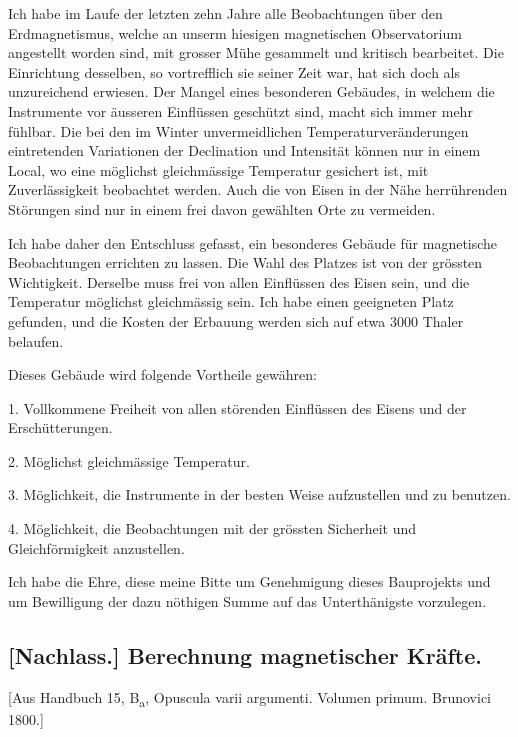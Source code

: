 \documentclass[12pt,a4paper]{article}
\begin{document}
Ich habe im Laufe der letzten zehn Jahre alle Beobachtungen \"uber den Erdmagnetismus, welche an unserm hiesigen magnetischen Observatorium angestellt worden sind, mit grosser M\"uhe gesammelt und kritisch bearbeitet. Die Einrichtung desselben, so vortrefflich sie seiner Zeit war, hat sich doch als unzureichend erwiesen. Der Mangel eines besonderen Geb\"audes, in welchem die Instrumente vor \"ausseren Einfl\"ussen gesch\"utzt sind, macht sich immer mehr f\"uhlbar. Die bei den im Winter unvermeidlichen Temperaturver\"anderungen eintretenden Variationen der Declination und Intensit\"at k\"onnen nur in einem Local, wo eine m\"oglichst gleichm\"assige Temperatur gesichert ist, mit Zuverl\"assigkeit beobachtet werden. Auch die von Eisen in der N\"ahe herr\"uhrenden St\"orungen sind nur in einem frei davon gew\"ahlten Orte zu vermeiden.

Ich habe daher den Entschluss gefasst, ein besonderes Geb\"aude f\"ur magnetische Beobachtungen errichten zu lassen. Die Wahl des Platzes ist von der gr\"ossten Wichtigkeit. Derselbe muss frei von allen Einfl\"ussen des Eisen sein, und die Temperatur m\"oglichst gleichm\"assig sein. Ich habe einen geeigneten Platz gefunden, und die Kosten der Erbauung werden sich auf etwa 3000 Thaler belaufen.

Dieses Geb\"aude wird folgende Vortheile gew\"ahren:

1. Vollkommene Freiheit von allen st\"orenden Einfl\"ussen des Eisens und der Ersch\"utterungen.

2. M\"oglichst gleichm\"assige Temperatur.

3. M\"oglichkeit, die Instrumente in der besten Weise aufzustellen und zu benutzen.

4. M\"oglichkeit, die Beobachtungen mit der gr\"ossten Sicherheit und Gleichf\"ormigkeit anzustellen.

Ich habe die Ehre, diese meine Bitte um Genehmigung dieses Bauprojekts und um Bewilligung der dazu n\"othigen Summe auf das Unterth\"anigste vorzulegen.


\newpage
\subsection*{[Nachlass.] Berechnung magnetischer Kr\"afte.}

[Aus Handbuch 15, B\textsubscript{a}, Opuscula varii argumenti. Volumen primum. Brunovici 1800.]
\end{document}
